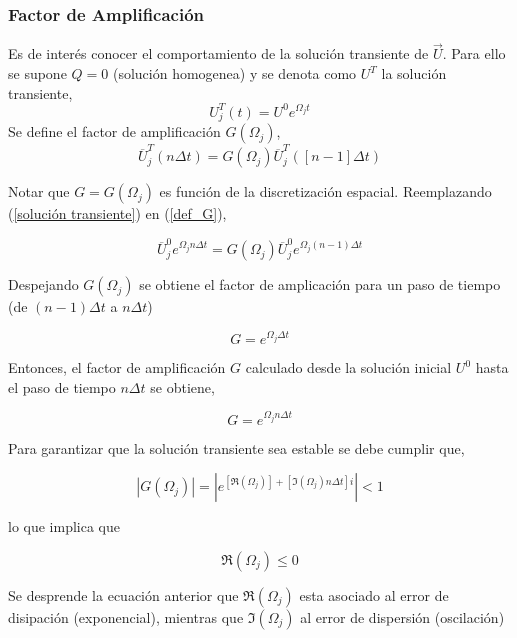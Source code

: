 \subsubsection{Factor de Amplificación}

Es de interés conocer el comportamiento de la solución transiente de $\vec{U}$. Para ello se supone $Q=0$ (solución homogenea) y se denota como $U^T$ la solución transiente,
\begin{equation} \label{solución transiente}
U_j^T(t) = U^0 e^{\Omega_jt}
\end{equation}
Se define el factor de amplificación $G(\Omega_j)$,
\begin{equation} \label{def_G}
\overline{U}_j^T (n \Delta t) = G(\Omega_j) \overline{U}_j^T \left( \left[ n-1 \right] \Delta t \right)
\end{equation}

Notar que $G = G(\Omega_j)$ es función de la discretización espacial. Reemplazando (\ref{solución transiente}) en (\ref{def_G}),

\begin{equation}
\overline{U}_j^0 e^{\Omega_j n \Delta t} = G(\Omega_j) \overline{U}_j^0 e^{\Omega_j (n-1) \Delta t}
\end{equation}

Despejando $G(\Omega_j)$ se obtiene el factor de amplicación para un paso de tiempo (de $ (n-1) \Delta t$ a $n \Delta t$)

\begin{equation}
G = e^{\Omega_j \Delta t}
\end{equation}

Entonces, el factor de amplificación $G$ calculado desde la solución inicial $U^0$ hasta el paso de tiempo $n \Delta t$ se obtiene,

\begin{equation}
G = e^{\Omega_j n \Delta t}
\end{equation}

Para garantizar que la solución transiente sea estable se debe cumplir que,

\begin{equation}
| G(\Omega_j) | = | e^{ \left[ \Re(\Omega_j) \right] + \left[ \Im(\Omega_j) n \Delta t \right] i} | < 1
\end{equation}

lo que implica que

\begin{equation}
\Re(\Omega_j) \leq 0
\end{equation}

Se desprende la ecuación anterior que $\Re(\Omega_j)$ esta asociado al error de disipación (exponencial), mientras que $\Im(\Omega_j)$ al error de dispersión (oscilación)

